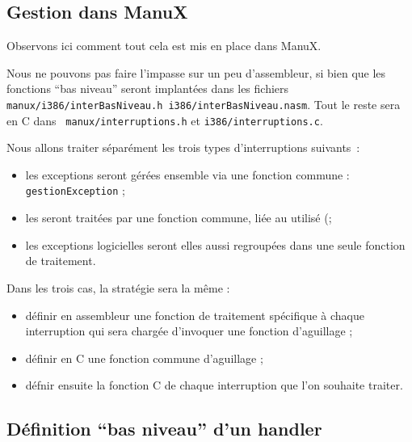 \begin{itemize}
%      
\section{Gestion dans ManuX}

   Observons ici comment tout cela est mis en place dans ManuX.

   Nous ne pouvons pas faire l'impasse sur un peu d'assembleur, si
bien que les fonctions ``bas niveau'' seront implantées dans les
fichiers {\tt manux/i386/interBasNiveau.h
  i386/interBasNiveau.nasm}. Tout le reste sera en C dans {\tt
  manux/interruptions.h} et {\tt i386/interruptions.c}.

   Nous allons traiter séparément les trois types d'interruptions
suivants~:

\begin{itemize}
   \item les exceptions seront gérées ensemble via une fonction
     commune : \lstinline!gestionException! ;
   \item les \irq seront traitées par une fonction commune, liée au \pic
     utilisé (;
   \item les exceptions logicielles seront elles aussi regroupées dans
     une seule fonction de traitement.
\end{itemize}

   Dans les trois cas, la stratégie sera la même :

\begin{itemize}
   \item définir en assembleur une fonction de traitement spécifique à
   chaque interruption qui sera chargée d'invoquer une fonction
   d'aguillage ;
   \item définir en C une fonction commune d'aguillage ;
   \item défnir ensuite la fonction C de chaque interruption que l'on
    souhaite traiter.
\end{itemize}

%      
\subsection{Définition ``bas niveau'' d'un handler}


\end{itemize}
